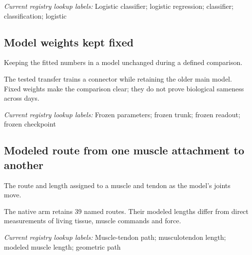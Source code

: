 \noindent\textit{Current registry lookup labels:} Logistic classifier; logistic regression; classifier; classification; logistic\par

\begin{samepage}
\subsection*{Model weights kept fixed}
\noindent Keeping the fitted numbers in a model unchanged during a defined comparison.\par
\end{samepage}
\begin{samepage}
\noindent The tested transfer trains a connector while retaining the older main model. Fixed weights make the comparison clear; they do not prove biological sameness across days.\par\nopagebreak[4]

\end{samepage}


\noindent\textit{Current registry lookup labels:} Frozen parameters; frozen trunk; frozen readout; frozen checkpoint\par

\begin{samepage}
\subsection*{Modeled route from one muscle attachment to another}
\noindent The route and length assigned to a muscle and tendon as the model’s joints move.\par
\end{samepage}
\begin{samepage}
\noindent The native arm retains 39 named routes. Their modeled lengths differ from direct measurements of living tissue, muscle commands and force.\par\nopagebreak[4]

\end{samepage}


\noindent\textit{Current registry lookup labels:} Muscle-tendon path; musculotendon length; modeled muscle length; geometric path\par


